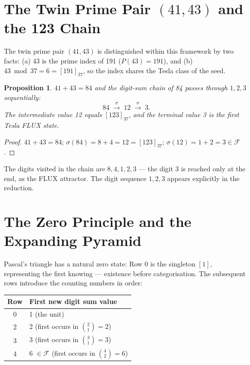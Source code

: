\documentclass[12pt]{article}
\newtheorem{proposition}[theorem]{Proposition}
\begin{document}
\section{The Twin Prime Pair $(41,43)$ and the 123 Chain}
\label{sec:4143}

The twin prime pair $(41,43)$ is distinguished within this framework by
two facts: (a) 43 is the prime index of 191 ($P(43)=191$), and (b)
$43\bmod 37 = 6 = [191]_{37}$, so the index shares the Tesla class of
the seed.

\begin{proposition}
$41+43=84$ and the digit-sum chain of 84 passes through
$1,2,3$ sequentially:
\[
    84 \;\xrightarrow{\sigma}\; 12 \;\xrightarrow{\sigma}\; 3.
\]
The intermediate value 12 equals $[123]_{37}$, and the terminal value
3 is the first Tesla FLUX state.
\end{proposition}

\begin{proof}
$41+43=84$;\; $\sigma(84)=8+4=12=[123]_{37}$;\; $\sigma(12)=1+2=3\in\mathcal{F}$.
\end{proof}

The digits visited in the chain are $8,4,1,2,3$ --- the digit 3 is
reached only at the end, as the FLUX attractor.  The digit sequence
$1,2,3$ appears explicitly in the reduction.

\section{The Zero Principle and the Expanding Pyramid}
\label{sec:zero}

Pascal's triangle has a natural zero state: Row 0 is the singleton $[1]$,
representing the first knowing --- existence before categorisation.  The
subsequent rows introduce the counting numbers in order:

\begin{center}
\begin{tabular}{cl}
\toprule
Row & First new digit sum value \\
\midrule
0 & 1 (the unit) \\
2 & 2 (first occurs in $\binom{2}{1}=2$) \\
3 & 3 (first occurs in $\binom{3}{1}=3$) \\
4 & 6 $\in\mathcal{F}$ (first occurs in $\binom{4}{2}=6$) \\
\bottomrule
\end{tabular}
\end{center}
\end{document}
